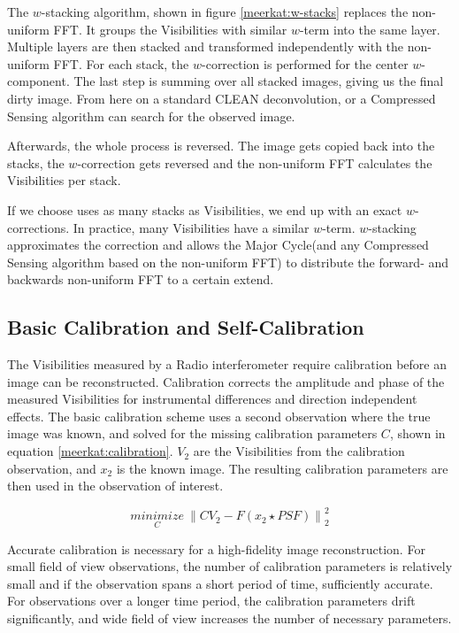 The $w$-stacking algorithm, shown in figure \ref{meerkat:w-stacks} replaces the non-uniform FFT. It groups the Visibilities with similar $w$-term into the same layer. Multiple layers are then stacked and transformed independently with the non-uniform FFT. For each stack, the $w$-correction is performed for the center $w$-component. The last step is summing over all stacked images, giving us the final dirty image. From here on a standard CLEAN deconvolution, or a Compressed Sensing algorithm can search for the observed image.

Afterwards, the whole process is reversed. The image gets copied back into the stacks, the $w$-correction gets reversed and the non-uniform FFT calculates the Visibilities per stack.

If we choose uses as many stacks as Visibilities, we end up with an exact $w$-corrections. In practice, many Visibilities have a similar $w$-term. $w$-stacking approximates the correction and allows the Major Cycle(and any Compressed Sensing algorithm based on the non-uniform FFT) to distribute the forward- and backwards non-uniform FFT to a certain extend.

\subsection{Basic Calibration and Self-Calibration}
The Visibilities measured by a Radio interferometer require calibration before an image can be reconstructed. Calibration corrects the amplitude and phase of the measured Visibilities for instrumental differences and direction independent effects. The basic calibration scheme uses a second observation where the true image was known, and solved for the missing calibration parameters $C$, shown in equation \eqref{meerkat:calibration}. $V_2$ are the Visibilities from the calibration observation, and $x_2$ is the known image. The resulting calibration parameters are then used in the observation of interest. 

\begin{equation}\label{meerkat:calibration}
\underset{C}{minimize} \: \left \| CV_2 - F(x_2 \star PSF) \right \|_2^2
\end{equation}

Accurate calibration is necessary for a high-fidelity image reconstruction. For small field of view observations, the number of calibration parameters is relatively small and if the observation spans a short period of time, sufficiently accurate. For observations over a longer time period, the calibration parameters drift significantly, and wide field of view increases the number of necessary parameters. 

